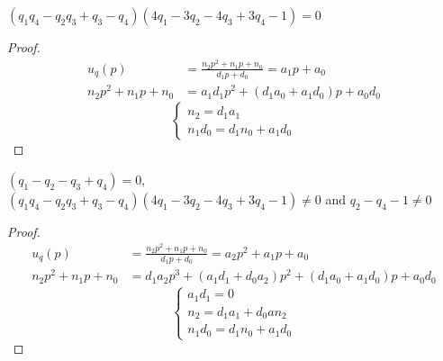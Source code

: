 \documentclass{beamer}
\begin{document}
\begin{frame}
\centering
\footnotesize
\begin{lemma}[Linear]\label{lemma:linear}
\((q_{1} 
q_{4} - q_{2} q_{3} + q_{3} - q_{4}) (4 q_{1} - 3 q_{2} - 4 q_{3} 
+ 3 q_{4} - 1) = 0\)
\end{lemma}

\begin{proof} 
\begin{align*}
u_q(p) & = \frac{n_2p^2 + n_1p + n_0 } {d_1p + d_0} = a_1p + a_0 \\
n_2p^2 + n_1p + n_0 & = a_1d_1p^2 + (d_1a_0 + a_1d_0)p + a_0d_0 
\end{align*}
\[\begin{cases}
          n_2 = d_1a_1\\
          n_1d_0 = d_1n_0 + a_1 d_0
  \end{cases}\]
\end{proof}
\end{frame}

\begin{frame}
\centering
\footnotesize
\begin{lemma}[Quadratic]\label{lemma:quadratic}
\((q_{1} - q_{2} - q_{3} + q_{4})  = 0 \), \((q_{1} q_{4} - q_{2} q_{3} + q_{3} - q_{4}) (4 q_{1} - 3 q_{2} - 4 q_{3} + 3 q_{4} - 1) \neq 0\) and \(q_2 - q_4 -1 \neq 0\)
\end{lemma}

\begin{proof} 
\begin{align*}
u_q(p) & = \frac{n_2p^2 + n_1p + n_0 } {d_1p + d_0} = a_2p^2 + a_1p + a_0 \\
n_2p^2 + n_1p + n_0 & = d_1a_2p^3 + (a_1d_1 + d_0a_2)p^2 + (d_1a_0 + a_1d_0)p + a_0d_0
\end{align*}
\[\begin{cases}
          a_1d_1 = 0 \\
          n_2 = d_1a_1 + d_0an_2\\
          n_1d_0 = d_1n_0 + a_1 d_0
  \end{cases}\]
\end{proof}
\end{frame}
\end{document}
